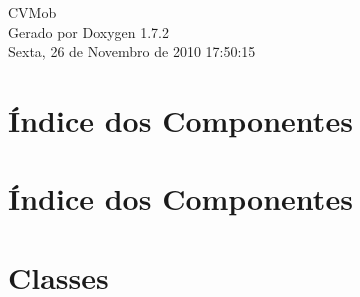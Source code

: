 \documentclass[a4paper]{book}
\begin{document}
\hypersetup{pageanchor=false}
\begin{titlepage}
\vspace*{7cm}
\begin{center}
{\Large CVMob }\\
\vspace*{1cm}
{\large Gerado por Doxygen 1.7.2}\\
\vspace*{0.5cm}
{\small Sexta, 26 de Novembro de 2010 17:50:15}\\
\end{center}
\end{titlepage}
\clearemptydoublepage
{}
\tableofcontents
\clearemptydoublepage
{}
\hypersetup{pageanchor=true}
\chapter{Índice dos Componentes}

\chapter{Índice dos Componentes}

\chapter{Classes}
















\printindex
\end{document}
